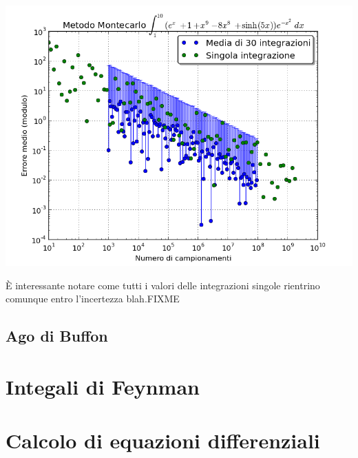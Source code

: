 \documentclass[a4paper,10pt]{article}
\begin{document}
\includegraphics[scale=.5]{../images/montecarlo-comparison.png}

È interessante notare come tutti i valori delle integrazioni singole rientrino comunque entro l'incertezza blah.FIXME

\subsection{Ago di Buffon}

\section{Integali di Feynman}

\section{Calcolo di equazioni differenziali}
\end{document}
